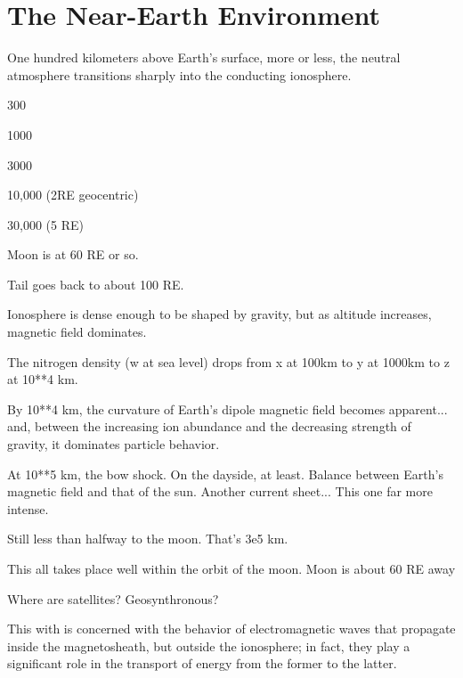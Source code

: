 
\chapter{The Near-Earth Environment}
  \label{ch_intro}


One hundred kilometers above Earth's surface, more or less, the neutral atmosphere transitions sharply into the conducting ionosphere.

300

1000

3000

10,000 (2RE geocentric)

30,000 (5 RE)

Moon is at 60 RE or so. 

Tail goes back to about 100 RE. 

Ionosphere is dense enough to be shaped by gravity, but as altitude increases, magnetic field dominates.

The nitrogen density (w at sea level) drops from x at 100km to y at 1000km to z at 10**4 km.

By 10**4 km, the curvature of Earth's dipole magnetic field becomes apparent... and, between the increasing ion abundance and the decreasing strength of gravity, it dominates particle behavior.

At 10**5 km, the bow shock. On the dayside, at least. Balance between Earth's magnetic field and that of the sun. Another current sheet... This one far more intense.

Still less than halfway to the moon. That's 3e5 km.

This all takes place well within the orbit of the moon. Moon is about 60 RE away

Where are satellites? Geosynthronous? 

This with is concerned with the behavior of electromagnetic waves that propagate inside the magnetosheath, but outside the ionosphere; in fact, they play a significant role in the transport of energy from the former to the latter. 

